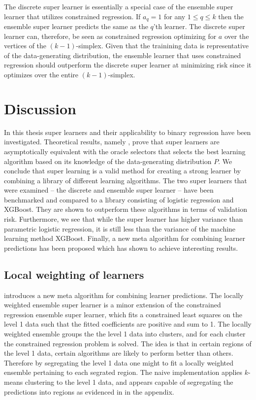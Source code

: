 \documentclass[11pt, a4paper]{article}
\theoremstyle{definition}
\theoremstyle{remark}
\newcommand{\q}{q}
\newcommand{\ml}{k}
\begin{document}
The discrete super learner is essentially a special case of the ensemble super learner that utilizes constrained regression. If $ a_\q = 1 $ for any $ 1 \leq \q \leq k $ then the ensemble super learner predicts the same as the $ \q $'th learner. The discrete super learner can, therefore, be seen as constrained regression optimizing for $ a $ over the vertices of the $ (\ml -1) $-simplex. Given that the trainining data is representative of the data-generating distribution, the ensemble learner that uses constrained regression should outperform the discrete super learner at minimizing risk since it optimizes over the entire $ (\ml -1) $-simplex.  


\section{Discussion}
In this thesis super learners and their applicability to binary regression have been investigated. Theoretical results, namely , prove that super learners are asymptotically equivalent with the oracle selectors that selects the best learning algorithm based on its knowledge of the data-generating distribution $ P $. We conclude that super learning is a valid method for creating a strong learner by combining a library of different learning algorithms. The two super learners that were examined -- the discrete and ensemble super learner -- have been benchmarked and compared to a library consisting of logistic regression and XGBoost. They are shown to outperform these algorithms in terms of validation risk. Furthermore, we see that while the super learner has higher variance than parametric logistic regression, it is still less than the variance of the machine learning method XGBoost. Finally, a new meta algorithm for combining learner predictions has been proposed which has shown to achieve interesting results.  

\subsection{Local weighting of learners}
 introduces a new meta algorithm for combining learner predictions. The locally weighted ensemble super learner is a minor extension of the constrained regression ensemble super learner, which fits a constrained least squares on the level 1 data such that the fitted coefficients are positive and sum to 1. The locally weighted ensemble groups the the level 1 data into clusters, and for each cluster the constrained regression problem is solved. The idea is that in certain regions of the level 1 data, certain algorithms are likely to perform better than others. Therefore by segregating the level 1 data one might to fit a locally weighted ensemble pertaining to each segrated region. The naive implementation applies $ k $-means clustering to the level 1 data, and appears capable of segregating the predictions into regions as evidenced in  in the appendix. 
\end{document}
